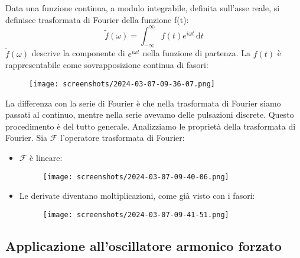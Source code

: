\begin{definition}
	Data una funzione continua, a modulo integrabile, definita sull'asse reale, si definisce trasformata di Fourier della funzione f(t):
	\[
		\widetilde{f}(\omega )=\int_{-\infty}^{\infty} f(t)e^{i \omega t} \,\mathrm{d}t  
	\]
	\(\widetilde{f}(\omega ) \) descrive la componente di \(e^{i \omega t}\) nella funzione di partenza. La \(f(t)\) è rappresentabile come sovrapposizione continua di fasori:
	\begin{figure}[H]
		\centering
		\texttt{[image: screenshots/2024-03-07-09-36-07.png]}
	\end{figure}   
\end{definition}

La differenza con la serie di Fourier è che nella trasformata di Fourier siamo passati al continuo, mentre nella serie avevamo delle pulsazioni discrete. Questo procedimento è del tutto generale. Analizziamo le proprietà della trasformata di Fourier. Sia \(\mathcal{F} \) l'operatore trasformata di Fourier:

\begin{itemize}
	
	\item \(\mathcal{F} \) è lineare:
	\begin{figure}[H]
		\centering
		\texttt{[image: screenshots/2024-03-07-09-40-06.png]}
	\end{figure}
	
	\item Le derivate diventano moltiplicazioni, come già visto con i fasori:
	\begin{figure}[H]
		\centering
		\texttt{[image: screenshots/2024-03-07-09-41-51.png]}
	\end{figure}
\end{itemize}

\subsection{Applicazione all'oscillatore armonico forzato}

